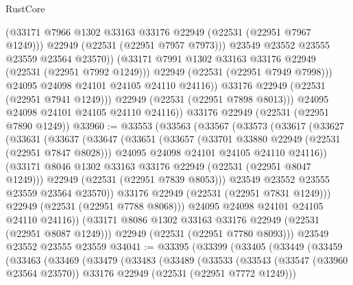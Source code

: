\begin{lexlean}{RustCore}
\begin{coremodule}
                        (@33171 @7966 @1302 @33163 @33176 @22949 (@22531 (@22951 @7967 @1249)))
                        @22949
                        (@22531 (@22951 @7957 @7973)))
                      @23549
                      @23552
                      @23555
                      @23559
                      @23564
                      @23570))
                  (@33171 @7991 @1302 @33163 @33176 @22949 (@22531 (@22951 @7992 @1249)))
                  @22949
                  (@22531 (@22951 @7949 @7998)))
                @24095
                @24098
                @24101
                @24105
                @24110
                @24116))
            @33176
            @22949
            (@22531 (@22951 @7941 @1249)))
          @22949
          (@22531 (@22951 @7898 @8013)))
        @24095
        @24098
        @24101
        @24105
        @24110
        @24116))
    @33176
    @22949
    (@22531 (@22951 @7890 @1249))
@33960 := @33553
    (@33563
      (@33567
        (@33573
          (@33617
            (@33627
              (@33631
                (@33637
                  (@33647
                    (@33651
                      (@33657
                        (@33701 @33880 @22949 (@22531 (@22951 @7847 @8028)))
                        @24095
                        @24098
                        @24101
                        @24105
                        @24110
                        @24116))
                    (@33171 @8046 @1302 @33163 @33176 @22949 (@22531 (@22951 @8047 @1249)))
                    @22949
                    (@22531 (@22951 @7839 @8053)))
                  @23549
                  @23552
                  @23555
                  @23559
                  @23564
                  @23570))
              @33176
              @22949
              (@22531 (@22951 @7831 @1249)))
            @22949
            (@22531 (@22951 @7788 @8068)))
          @24095
          @24098
          @24101
          @24105
          @24110
          @24116))
      (@33171 @8086 @1302 @33163 @33176 @22949 (@22531 (@22951 @8087 @1249)))
      @22949
      (@22531 (@22951 @7780 @8093)))
    @23549
    @23552
    @23555
    @23559
@34041 := @33395
    (@33399
      (@33405
        (@33449
          (@33459
            (@33463
              (@33469
                (@33479
                  (@33483
                    (@33489
                      (@33533
                        (@33543
                          (@33547 (@33960 @23564 @23570))
                          @33176
                          @22949
                          (@22531 (@22951 @7772 @1249)))

\end{coremodule}
\end{lexlean}
